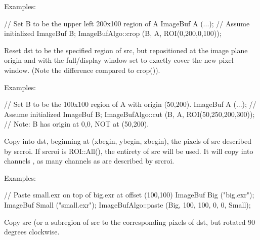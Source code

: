 \smallskip
\noindent Examples:
\begin{code}
    // Set B to be the upper left 200x100 region of A
    ImageBuf A (...);  // Assume initialized
    ImageBuf B;
    ImageBufAlgo::crop (B, A, ROI(0,200,0,100));
\end{code}
\apiend


 
Reset {\cf dst} to be the specified region of {\cf src}, but repositioned at
the image plane origin and with the full/display window set to exactly cover
the new pixel window.  (Note the difference compared to {\cf crop()}).

\smallskip
\noindent Examples:
\begin{code}
    // Set B to be the 100x100 region of A with origin (50,200).
    ImageBuf A (...);  // Assume initialized
    ImageBuf B;
    ImageBufAlgo::cut (B, A, ROI(50,250,200,300));
    // Note: B has origin at 0,0, NOT at (50,200).
\end{code}
\apiend


 
Copy into {\cf dst}, beginning at {\cf (xbegin, ybegin, zbegin)}, the pixels of
{\cf src} described by {\cf srcroi}.  If {\cf srcroi} is {\cf ROI::All()},
the entirety of src will be used.  It will copy into channels 
{\cf [chbegin...]}, as many channels as are described by {\cf srcroi}.

\smallskip
\noindent Examples:
\begin{code}
    // Paste small.exr on top of big.exr at offset (100,100)
    ImageBuf Big ("big.exr");
    ImageBuf Small ("small.exr");
    ImageBufAlgo::paste (Big, 100, 100, 0, 0, Small);
\end{code}
\apiend


 
Copy {\cf src} (or a subregion of {\cf src} to the corresponding pixels
of {\cf dst}, but rotated 90 degrees clockwise.

